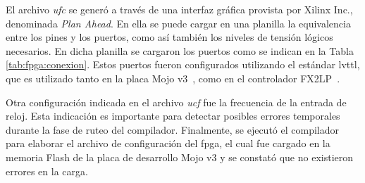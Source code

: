 	El archivo \textit{ufc} se generó a través de una interfaz gráfica provista por Xilinx Inc., denominada \textit{Plan Ahead}. En ella se puede cargar en una planilla la equivalencia entre los pines y los puertos, como así también los niveles de tensión lógicos necesarios. En dicha planilla se cargaron los puertos como se indican en la Tabla \ref{tab:fpga:conexion}. Estos puertos fueron configurados utilizando el estándar \acrshort{lvttl}, que es utilizado tanto en la placa Mojo v3~\cite{Mojo}, como en el controlador FX2LP~\cite{Cypress2017}.
	
	Otra configuración indicada en el archivo \textit{ucf} fue la frecuencia de la entrada de reloj. Esta indicación es importante para detectar posibles errores temporales durante la fase de ruteo del compilador. Finalmente, se ejecutó el compilador para elaborar el archivo de configuración del \acrshort{fpga}, el cual fue cargado en la memoria Flash de la placa de desarrollo Mojo v3 y se constató que no existieron errores en la carga.
	